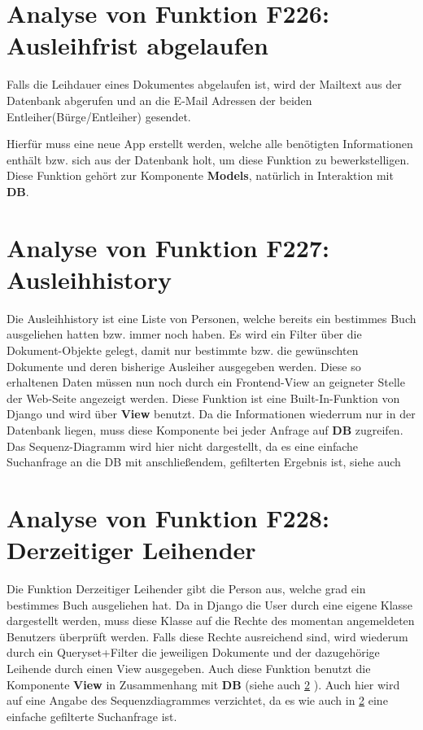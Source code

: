 \section{Analyse von Funktion F226: Ausleihfrist abgelaufen}
Falls die Leihdauer eines Dokumentes abgelaufen ist, wird der Mailtext aus der 
Datenbank abgerufen und an die E-Mail Adressen der beiden Entleiher(Bürge/Entleiher) gesendet.

Hierfür muss eine neue App erstellt werden, welche alle benötigten Informationen enthält bzw. sich aus der Datenbank holt, um diese Funktion zu bewerkstelligen.
Diese Funktion gehört zur Komponente \textbf{Models}, natürlich in Interaktion mit \textbf{DB}.


\section{Analyse von Funktion F227: Ausleihhistory}
\label{f:227}
Die Ausleihhistory ist eine Liste von Personen, welche bereits ein bestimmes Buch ausgeliehen hatten bzw. immer noch haben.
Es wird ein Filter über die Dokument-Objekte gelegt, damit nur bestimmte bzw. die gewünschten Dokumente und deren bisherige Ausleiher ausgegeben werden. Diese so erhaltenen Daten müssen nun noch durch ein Frontend-View an geigneter Stelle der Web-Seite angezeigt werden.
Diese Funktion ist eine Built-In-Funktion von Django und wird über \textbf{View} benutzt. Da die Informationen wiederrum nur in der Datenbank liegen, muss diese Komponente bei jeder Anfrage auf \textbf{DB} zugreifen.
Das Sequenz-Diagramm wird hier nicht dargestellt, da es eine einfache Suchanfrage an die DB mit anschließendem, gefilterten Ergebnis ist, siehe auch 

\section{Analyse von Funktion F228: Derzeitiger Leihender}
\label{f:228}
Die Funktion Derzeitiger Leihender gibt die Person aus, welche grad ein bestimmes Buch ausgeliehen hat.
Da in Django die User durch eine eigene Klasse dargestellt werden, muss diese Klasse auf die Rechte des momentan angemeldeten Benutzers überprüft werden. Falls diese Rechte ausreichend sind, wird wiederum durch ein Queryset+Filter die jeweiligen Dokumente und der dazugehörige Leihende durch einen View ausgegeben.
Auch diese Funktion benutzt die Komponente \textbf{View} in Zusammenhang mit \textbf{DB} (siehe auch \ref{f:227} ).
Auch hier wird auf eine Angabe des Sequenzdiagrammes verzichtet, da es wie auch in \ref{f:227}  eine einfache gefilterte Suchanfrage ist.



